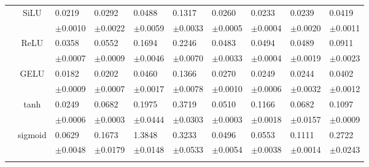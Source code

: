 \documentclass{article}
\begin{document}
\begin{table}[h!]
{\begin{tabularx}{\textwidth}{ccXXXXXXXX}
        \hline\rule{0pt}{2.3ex}
        
    
        \multirow{14}{*}{\textsf{MAE\textsubscript{nf}}} 
        & \multirow{2}{*}{SiLU}
        & 0.0219 & 0.0292 & 0.0488 & 0.1317 & 0.0260 & 0.0233 & 0.0239 & 0.0419\\
        &&\scriptsize $\pm$0.0010 & \scriptsize $\pm$0.0022 & \scriptsize $\pm$0.0059 & \scriptsize $\pm$0.0033 & \scriptsize $\pm$0.0005 & \scriptsize $\pm$0.0004 & \scriptsize $\pm$0.0020 & \scriptsize $\pm$0.0011\\
        \cline{3-10}\rule{0pt}{2.3ex}

        & \multirow{2}{*}{ReLU}
        & 0.0358 & 0.0552 & 0.1694 & 0.2246 & 0.0483 & 0.0494 & 0.0489 & 0.0911\\
        &&\scriptsize $\pm$0.0007 & \scriptsize $\pm$0.0009 & \scriptsize $\pm$0.0046 & \scriptsize $\pm$0.0070 & \scriptsize $\pm$0.0033 & \scriptsize $\pm$0.0004 & \scriptsize $\pm$0.0019 & \scriptsize $\pm$0.0023\\
        \cline{3-10}\rule{0pt}{2.3ex}

        & \multirow{2}{*}{GELU}
        & 0.0182 & 0.0202 & 0.0460 & 0.1366 & 0.0270 & 0.0249 & 0.0244 & 0.0402\\
        &&\scriptsize $\pm$0.0009 & \scriptsize $\pm$0.0007 & \scriptsize $\pm$0.0017 & \scriptsize $\pm$0.0078 & \scriptsize $\pm$0.0010 & \scriptsize $\pm$0.0006 & \scriptsize $\pm$0.0032 & \scriptsize $\pm$0.0012\\
        \cline{3-10}\rule{0pt}{2.3ex}

        & \multirow{2}{*}{tanh}
        & 0.0249 & 0.0682 & 0.1975 & 0.3719 & 0.0510 & 0.1166 & 0.0682 & 0.1097\\
        &&\scriptsize $\pm$0.0006 & \scriptsize $\pm$0.0003 & \scriptsize $\pm$0.0444 & \scriptsize $\pm$0.0303 & \scriptsize $\pm$0.0003 & \scriptsize $\pm$0.0018 & \scriptsize $\pm$0.0157 & \scriptsize $\pm$0.0009\\
        \cline{3-10}\rule{0pt}{2.3ex}

        & \multirow{2}{*}{sigmoid}
        & 0.0629 & 0.1673 & 1.3848 & 0.3233 & 0.0496 & 0.0553 & 0.1111 & 0.2722\\
        &&\scriptsize $\pm$0.0048 & \scriptsize $\pm$0.0179 & \scriptsize $\pm$0.0148 & \scriptsize $\pm$0.0533 & \scriptsize $\pm$0.0054 & \scriptsize $\pm$0.0038 & \scriptsize $\pm$0.0014 & \scriptsize $\pm$0.0243\\
        \cline{3-10}\rule{0pt}{2.3ex}


\end{tabularx}}
\end{table}
\end{document}
